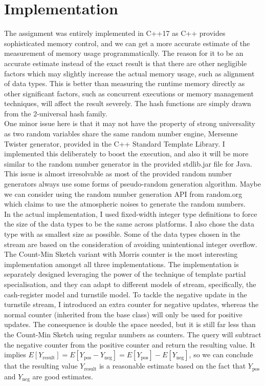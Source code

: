 \documentclass[a4paper, 11pt]{article}
\begin{document}
    \section{Implementation}
        The assignment was entirely implemented in C++17 as C++ provides sophisticated memory control, and we can get a more accurate estimate of the measurement of memory usage programmatically. The reason for it to be an accurate estimate instead of the exact result is that there are other negligible factors which may slightly increase the actual memory usage, such as alignment of data types. This is better than measuring the runtime memory directly as other significant factors, such as concurrent executions or memory management techniques, will affect the result severely. The hash functions are simply drawn from the 2-universal hash family. \\

        \noindent One minor issue here is that it may not have the property of strong universality as two random variables share the same random number engine, Mersenne Twister generator, provided in the C++ Standard Template Library. I implemented this deliberately to boost the execution, and also it will be more similar to the random number generator in the provided stdlib.jar file for Java. This issue is almost irresolvable as most of the provided random number generators always use some forms of pseudo-random generation algorithm. Maybe we can consider using the random number generation API from random.org which claims to use the atmospheric noises to generate the random numbers. \\

        \noindent In the actual implementation, I used fixed-width integer type definitions to force the size of the data types to be the same across platforms. I also chose the data type with as smallest size as possible. Some of the data types chosen in the stream are based on the consideration of avoiding unintentional integer overflow. \\

        \noindent The Count-Min Sketch variant with Morris counter is the most interesting implementation amongst all three implementations. The implementation is separately designed leveraging the power of the technique of template partial specialisation, and they can adapt to different models of stream, specifically, the cash-register model and turnstile model. To tackle the negative update in the turnstile stream, I introduced an extra counter for negative updates, whereas the normal counter (inherited from the base class) will only be used for positive updates. The consequence is double the space needed, but it is still far less than the Count-Min Sketch using regular numbers as counters. The query will subtract the negative counter from the positive counter and return the resulting value. It implies $E \left[ Y_{\text{result}} \right] = E \left[ Y_{\text{pos}} - Y_{\text{neg}} \right] = E \left[ Y_{\text{pos}} \right] - E \left[ Y_{\text{neg}} \right]$, so we can conclude that the resulting value $Y_{\text{result}}$ is a reasonable estimate based on the fact that $Y_{\text{pos}}$ and $Y_{\text{neg}}$ are good estimates.
\end{document}
